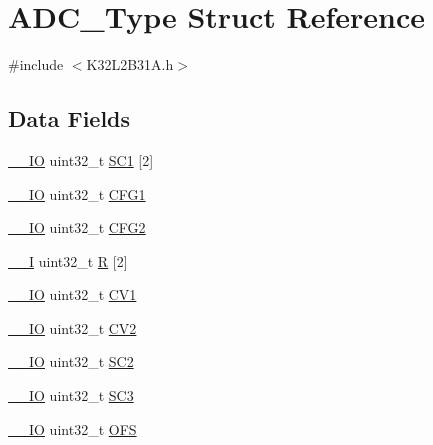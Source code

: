 \hypertarget{struct_a_d_c___type}{}\section{A\+D\+C\+\_\+\+Type Struct Reference}
\label{struct_a_d_c___type}


{\ttfamily \#include $<$K32\+L2\+B31\+A.\+h$>$}

\subsection*{Data Fields}
\begin{DoxyCompactItemize}
\item 
\mbox{\hyperlink{core__cm0plus_8h_aec43007d9998a0a0e01faede4133d6be}{\+\_\+\+\_\+\+IO}} uint32\+\_\+t \mbox{\hyperlink{struct_a_d_c___type_ac2f336dedf67a3b6dc792098c25f1197}{S\+C1}} \mbox{[}2\mbox{]}
\item 
\mbox{\hyperlink{core__cm0plus_8h_aec43007d9998a0a0e01faede4133d6be}{\+\_\+\+\_\+\+IO}} uint32\+\_\+t \mbox{\hyperlink{struct_a_d_c___type_abecccecd01b0d465123a2dc166db4141}{C\+F\+G1}}
\item 
\mbox{\hyperlink{core__cm0plus_8h_aec43007d9998a0a0e01faede4133d6be}{\+\_\+\+\_\+\+IO}} uint32\+\_\+t \mbox{\hyperlink{struct_a_d_c___type_a722c7bd03a5d7b185bf43bdb5f846d43}{C\+F\+G2}}
\item 
\mbox{\hyperlink{core__cm0plus_8h_af63697ed9952cc71e1225efe205f6cd3}{\+\_\+\+\_\+I}} uint32\+\_\+t \mbox{\hyperlink{struct_a_d_c___type_a2d5ff162ed91ca88f1f5ce93926a28a8}{R}} \mbox{[}2\mbox{]}
\item 
\mbox{\hyperlink{core__cm0plus_8h_aec43007d9998a0a0e01faede4133d6be}{\+\_\+\+\_\+\+IO}} uint32\+\_\+t \mbox{\hyperlink{struct_a_d_c___type_ab69f073a5103823855dfa98e8b75ec9c}{C\+V1}}
\item 
\mbox{\hyperlink{core__cm0plus_8h_aec43007d9998a0a0e01faede4133d6be}{\+\_\+\+\_\+\+IO}} uint32\+\_\+t \mbox{\hyperlink{struct_a_d_c___type_aa6d0c2c2ba809736fd08737b76334280}{C\+V2}}
\item 
\mbox{\hyperlink{core__cm0plus_8h_aec43007d9998a0a0e01faede4133d6be}{\+\_\+\+\_\+\+IO}} uint32\+\_\+t \mbox{\hyperlink{struct_a_d_c___type_ab3540714d43d0b62818c72e8dc20d90a}{S\+C2}}
\item 
\mbox{\hyperlink{core__cm0plus_8h_aec43007d9998a0a0e01faede4133d6be}{\+\_\+\+\_\+\+IO}} uint32\+\_\+t \mbox{\hyperlink{struct_a_d_c___type_ac9553a6641fb9da34cb7a0b63c7b2d4e}{S\+C3}}
\item 
\mbox{\hyperlink{core__cm0plus_8h_aec43007d9998a0a0e01faede4133d6be}{\+\_\+\+\_\+\+IO}} uint32\+\_\+t \mbox{\hyperlink{struct_a_d_c___type_a9c229965c5de3a76f0f694f7f008bd27}{O\+FS}}

\end{DoxyCompactItemize}

